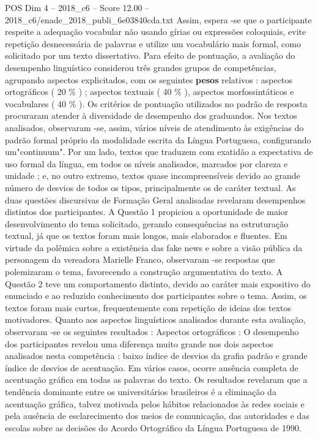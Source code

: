\begin{textsample}{POS Dim 4 – 2018\_c6 – Score 12.00 – 2018\_c6/enade\_2018\_publi\_6e03840cda.txt}
Assim, espera -se que o participante respeite a adequação vocabular não usando gírias ou expressões coloquiais, evite repetição desnecessária de palavras e utilize um vocabulário mais formal, como solicitado por um texto dissertativo.
Para efeito de pontuação, a avaliação do desempenho linguístico considerou três grandes grupos de competências, agrupando aspectos explicitados, com os seguintes \textbf{pesos} relativos : aspectos ortográficos ( 20 \% ) ; aspectos textuais ( 40 \% ), aspectos morfossintáticos e vocabulares ( 40 \% ).
Os critérios de pontuação utilizados no padrão de resposta procuraram atender à diversidade de desempenho dos graduandos.
Nos textos analisados, observaram -se, assim, vários níveis de atendimento às exigências do padrão formal próprio da modalidade escrita da Língua Portuguesa, configurando um"continuum".
Por um lado, textos que traduzem com exatidão a expectativa de uso formal da língua, em todos os níveis analisados, marcados por clareza e unidade ; e, no outro extremo, textos quase incompreensíveis devido ao grande número de desvios de todos os tipos, principalmente os de caráter textual.
As duas questões discursivas de Formação Geral analisadas revelaram desempenhos distintos dos participantes.
A Questão 1 propiciou a oportunidade de maior desenvolvimento do tema solicitado, gerando consequências na estruturação textual, já que os textos foram mais longos, mais elaborados e fluentes.
Em virtude da polêmica sobre a existência das fake news e sobre a visão pública da personagem da vereadora Marielle Franco, observaram -se respostas que polemizaram o tema, favorecendo a construção argumentativa do texto.
A Questão 2 teve um comportamento distinto, devido ao caráter mais expositivo do enunciado e ao reduzido conhecimento dos participantes sobre o tema.
Assim, os textos foram mais curtos, frequentemente com repetição de ideias dos textos motivadores.
Quanto aos aspectos linguísticos analisados durante esta avaliação, observaram -se os seguintes resultados : Aspectos ortográficos : O desempenho dos participantes revelou uma diferença muito grande nos dois aspectos analisados nesta competência : baixo índice de desvios da grafia padrão e grande índice de desvios de acentuação.
Em vários casos, ocorre ausência completa de acentuação gráfica em todas as palavras do texto.
Os resultados revelaram que a tendência dominante entre os universitários brasileiros é a eliminação da acentuação gráfica, talvez motivada pelos hábitos relacionados às redes sociais e pela ausência de esclarecimento dos meios de comunicação, das autoridades e das escolas sobre as decisões do Acordo Ortográfico da Língua Portuguesa de 1990.

\end{textsample}
